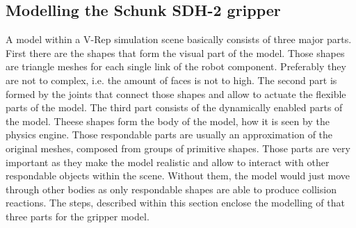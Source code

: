 \subsection{Modelling the Schunk SDH-2 gripper}

A model within a V-Rep simulation scene basically consists of three major parts. First there are the shapes that form the visual part of the model. Those shapes are triangle meshes for each single link of the robot component. Preferably they are not to complex, i.e. the amount of faces is not to high. The second part is formed by the joints that connect those shapes and allow to actuate the flexible parts of the model. The third part consists of the dynamically enabled parts of the model. Theese shapes form the body of the model, how it is seen by the physics engine. Those respondable parts are usually an approximation of the original meshes, composed from groups of primitive shapes. Those parts are very important as they make the model realistic and allow to interact with other respondable objects within the scene. Without them, the model would just move through other bodies as only respondable shapes are able to produce collision reactions. The steps, described within this section enclose the modelling of that three parts for the gripper model.\\

